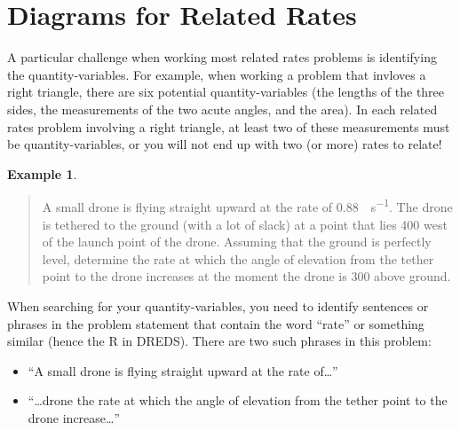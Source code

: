 \documentclass[10pt,oneside,]{book}
\newcommand{\acronym}[1]{#1}
\theoremstyle{plain}
\theoremstyle{definition}
\newtheorem{example}[theorem]{Example}
\numberwithin{equation}{section}
\begin{document}
\section[Diagrams for  Related Rates]{Diagrams for  Related Rates}\label{section-diagrams-for-related-rates}
A particular challenge when working most related rates problems is identifying the quantity-variables. For example, when working a problem that invloves a right triangle, there are six potential quantity-variables (the lengths of the three sides, the measurements of the two acute angles, and the area). In each related rates problem involving a right triangle, at least two of these measurements must be quantity-variables, or you will not end up with two (or more) rates to relate!%
\begin{example}\label{example-20}

            \begin{quote}A small drone is flying straight upward at the rate of \SI{0.88}{\foot\per\second}. The drone is tethered to the ground (with a lot of slack) at a point that lies \SI{400}{\foot} west of the launch point of the drone. Assuming that the ground is perfectly level, determine the rate at which the angle of elevation from the tether point to the drone increases at the moment the drone is \SI{300}{\foot} above ground.\end{quote}
\par
When searching for your quantity-variables, you need to identify sentences or phrases in the problem statement that contain the word ``rate'' or something similar (hence the \acronym{R} in \acronym{DREDS}). There are two such phrases in this problem:
        \begin{itemize}[label=\textbullet]
\item{}``A small drone is flying straight upward at the rate of\dots{}''\item{}``\dots{}drone the rate at which the angle of elevation from the tether point to the drone increase\dots{}''\end{itemize}


\end{example}
\end{document}
